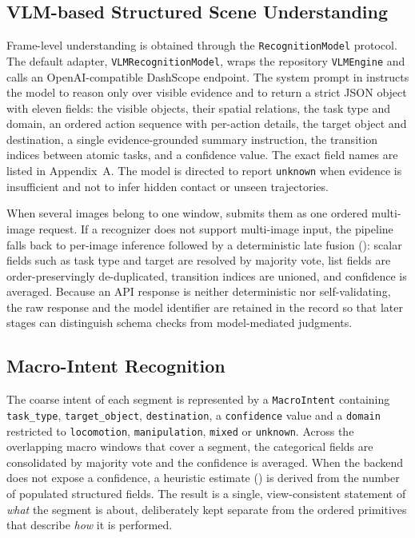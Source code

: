 \documentclass[11pt,oneside]{report}
\begin{document}
\subsection{VLM-based Structured Scene Understanding}
Frame-level understanding is obtained through the \texttt{RecognitionModel}
protocol. The default adapter, \texttt{VLMRecognitionModel}, wraps the repository
\texttt{VLMEngine} and calls an OpenAI-compatible DashScope endpoint. The system
prompt in  instructs the model to reason only over
visible evidence and to return a strict JSON object with eleven fields: the
visible objects, their spatial relations, the task type and domain, an ordered
action sequence with per-action details, the target object and destination, a
single evidence-grounded summary instruction, the transition indices between
atomic tasks, and a confidence value. The exact field names are listed in
Appendix~A. The model is directed to report \texttt{unknown} when evidence is
insufficient and not to infer hidden contact or unseen trajectories.

When several images belong to one window,  submits them as
one ordered multi-image request. If a recognizer does not support multi-image
input, the pipeline falls back to per-image inference followed by a
deterministic late fusion (): scalar fields such as
task type and target are resolved by majority vote, list fields are
order-preservingly de-duplicated, transition indices are unioned, and confidence
is averaged. Because an API response is neither deterministic nor
self-validating, the raw response and the model identifier are retained in the
record so that later stages can distinguish schema checks from model-mediated
judgments.

\subsection{Macro-Intent Recognition}
The coarse intent of each segment is represented by a \texttt{MacroIntent}
containing \texttt{task\_type}, \texttt{target\_object}, \texttt{destination},
a \texttt{confidence} value and a \texttt{domain} restricted to
\texttt{locomotion}, \texttt{manipulation}, \texttt{mixed} or \texttt{unknown}.
Across the overlapping macro windows that cover a segment, the categorical fields
are consolidated by majority vote and the confidence is averaged. When the
backend does not expose a confidence, a heuristic estimate
() is derived from the number of populated
structured fields. The result is a single, view-consistent statement of
\emph{what} the segment is about, deliberately kept separate from the ordered
primitives that describe \emph{how} it is performed.
\end{document}
